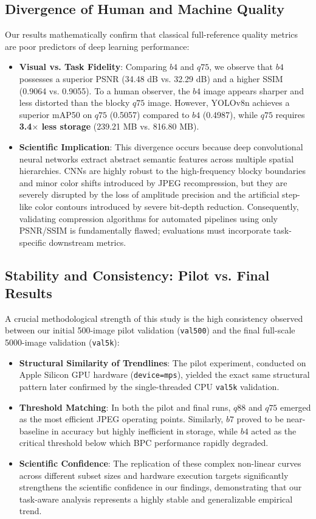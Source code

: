 \documentclass[12pt, a4paper]{article}
\begin{document}
\subsection{Divergence of Human and Machine Quality}
Our results mathematically confirm that classical full-reference quality metrics are poor predictors of deep learning performance:
\begin{itemize}
    \item \textbf{Visual vs. Task Fidelity}: Comparing $b4$ and $q75$, we observe that $b4$ possesses a superior PSNR (34.48 dB vs. 32.29 dB) and a higher SSIM (0.9064 vs. 0.9055). To a human observer, the $b4$ image appears sharper and less distorted than the blocky $q75$ image. However, YOLOv8n achieves a superior mAP50 on $q75$ (0.5057) compared to $b4$ (0.4987), while $q75$ requires \textbf{3.4$\times$ less storage} (239.21 MB vs. 816.80 MB).
    \item \textbf{Scientific Implication}: This divergence occurs because deep convolutional neural networks extract abstract semantic features across multiple spatial hierarchies. CNNs are highly robust to the high-frequency blocky boundaries and minor color shifts introduced by JPEG recompression, but they are severely disrupted by the loss of amplitude precision and the artificial step-like color contours introduced by severe bit-depth reduction. Consequently, validating compression algorithms for automated pipelines using only PSNR/SSIM is fundamentally flawed; evaluations must incorporate task-specific downstream metrics.
\end{itemize}

\subsection{Stability and Consistency: Pilot vs. Final Results}
A crucial methodological strength of this study is the high consistency observed between our initial 500-image pilot validation (\texttt{val500}) and the final full-scale 5000-image validation (\texttt{val5k}):
\begin{itemize}
    \item \textbf{Structural Similarity of Trendlines}: The pilot experiment, conducted on Apple Silicon GPU hardware (\texttt{device=mps}), yielded the exact same structural pattern later confirmed by the single-threaded CPU \texttt{val5k} validation.
    \item \textbf{Threshold Matching}: In both the pilot and final runs, $q88$ and $q75$ emerged as the most efficient JPEG operating points. Similarly, $b7$ proved to be near-baseline in accuracy but highly inefficient in storage, while $b4$ acted as the critical threshold below which BPC performance rapidly degraded.
    \item \textbf{Scientific Confidence}: The replication of these complex non-linear curves across different subset sizes and hardware execution targets significantly strengthens the scientific confidence in our findings, demonstrating that our task-aware analysis represents a highly stable and generalizable empirical trend.
\end{itemize}
\end{document}
